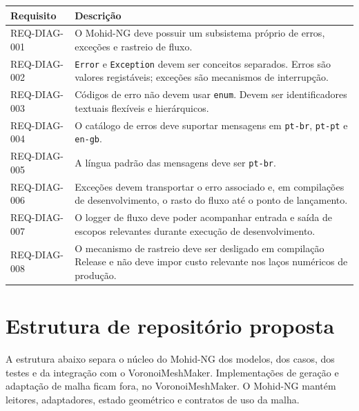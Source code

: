 \documentclass[11pt,a4paper]{article}
\begin{document}
\begin{longtable}{p{}p{}}
\toprule
\textbf{Requisito} & \textbf{Descri\c{c}\~ao}\\
\midrule
REQ-DIAG-001 & O Mohid-NG deve possuir um subsistema pr\'oprio de erros, exce\c{c}\~oes e rastreio de fluxo.\\
\addlinespace
REQ-DIAG-002 & \texttt{Error} e \texttt{Exception} devem ser conceitos separados. Erros s\~ao valores regist\'aveis; exce\c{c}\~oes s\~ao mecanismos de interrup\c{c}\~ao.\\
\addlinespace
REQ-DIAG-003 & C\'odigos de erro n\~ao devem usar \texttt{enum}. Devem ser identificadores textuais flex\'iveis e hier\'arquicos.\\
\addlinespace
REQ-DIAG-004 & O cat\'alogo de erros deve suportar mensagens em \texttt{pt-br}, \texttt{pt-pt} e \texttt{en-gb}.\\
\addlinespace
REQ-DIAG-005 & A l\'ingua padr\~ao das mensagens deve ser \texttt{pt-br}.\\
\addlinespace
REQ-DIAG-006 & Exce\c{c}\~oes devem transportar o erro associado e, em compila\c{c}\~oes de desenvolvimento, o rasto do fluxo at\'e o ponto de lan\c{c}amento.\\
\addlinespace
REQ-DIAG-007 & O logger de fluxo deve poder acompanhar entrada e sa\'ida de escopos relevantes durante execu\c{c}\~ao de desenvolvimento.\\
\addlinespace
REQ-DIAG-008 & O mecanismo de rastreio deve ser desligado em compila\c{c}\~ao Release e n\~ao deve impor custo relevante nos la\c{c}os num\'ericos de produ\c{c}\~ao.\\
\bottomrule
\end{longtable}

\section{Estrutura de reposit\'orio proposta}

A estrutura abaixo separa o n\'ucleo do Mohid-NG dos modelos, dos casos, dos testes e da integra\c{c}\~ao com o VoronoiMeshMaker. Implementa\c{c}\~oes de gera\c{c}\~ao e adapta\c{c}\~ao de malha ficam fora, no VoronoiMeshMaker. O Mohid-NG mant\'em leitores, adaptadores, estado geom\'etrico e contratos de uso da malha.
\end{document}
